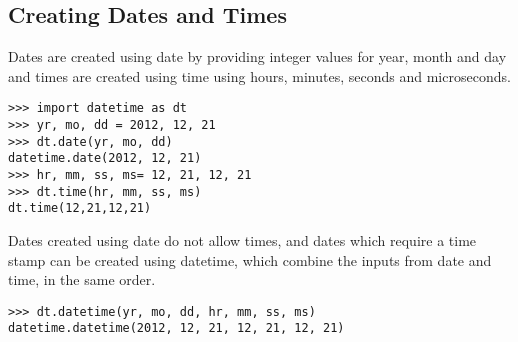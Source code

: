 
\subsection{Creating Dates and Times}

Dates are created using date by providing integer values for year, month and day and times are created
using time using hours, minutes, seconds and microseconds.

\begin{verbatim}
>>> import datetime as dt
>>> yr, mo, dd = 2012, 12, 21
>>> dt.date(yr, mo, dd)
datetime.date(2012, 12, 21)
>>> hr, mm, ss, ms= 12, 21, 12, 21
>>> dt.time(hr, mm, ss, ms)
dt.time(12,21,12,21)
\end{verbatim}

Dates created using date do not allow times, and dates which require a time stamp can be created using
datetime, which combine the inputs from date and time, in the same order.
\begin{verbatim}
>>> dt.datetime(yr, mo, dd, hr, mm, ss, ms)
datetime.datetime(2012, 12, 21, 12, 21, 12, 21)
\end{verbatim}
